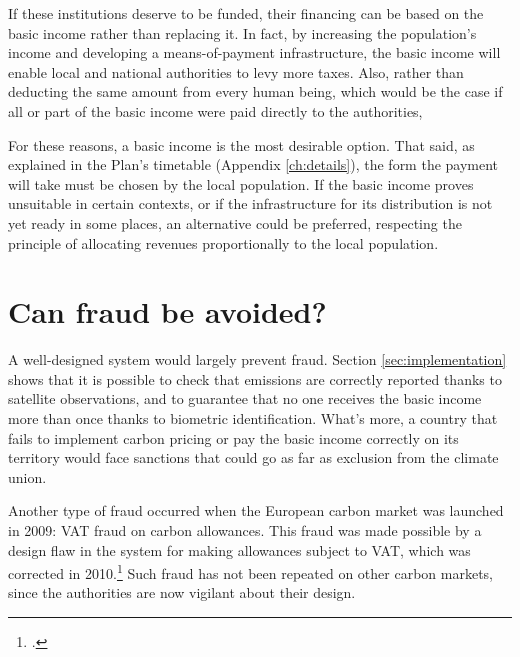 \documentclass[a5paper,english,openany]{memoir}
\begin{document}
If these institutions deserve to be funded, their financing can be based on the basic income rather than replacing it. In fact, by increasing the population's income and developing a means-of-payment infrastructure, the basic income will enable local and national authorities to levy more taxes. Also, rather than deducting the same amount from every human being, which would be the case if all or part of the basic income were paid directly to the authorities, %

For these reasons, a basic income is the most desirable option. That said, as explained in the Plan's timetable (Appendix \ref{ch:details}), the form the payment will take must be chosen by the local population. If the basic income proves unsuitable in certain contexts, or if the infrastructure for its distribution is not yet ready in some places, an alternative could be preferred, respecting the principle of allocating revenues proportionally to the local population. 

\section*{\normalsize Can fraud be avoided?}\label{q:fraude} %

A well-designed system would largely prevent fraud. Section \ref{sec:implementation} shows that it is possible to check that emissions are correctly reported thanks to satellite observations, and to guarantee that no one %
receives the basic income more than once thanks to biometric identification. What's more, a country that fails to implement carbon pricing or pay the basic income correctly on its territory would face sanctions that could go as far as exclusion from the climate union. 

Another type of fraud occurred when the European carbon market was launched in 2009: %
VAT fraud on carbon allowances. This fraud was made possible by a design flaw in the system for making allowances subject to VAT, which was corrected in 2010.\footnote{\citet{cour_des_comptes_fraude_2012}.} Such fraud has not been repeated on other carbon markets, since the authorities are now vigilant about their design.
\end{document}
